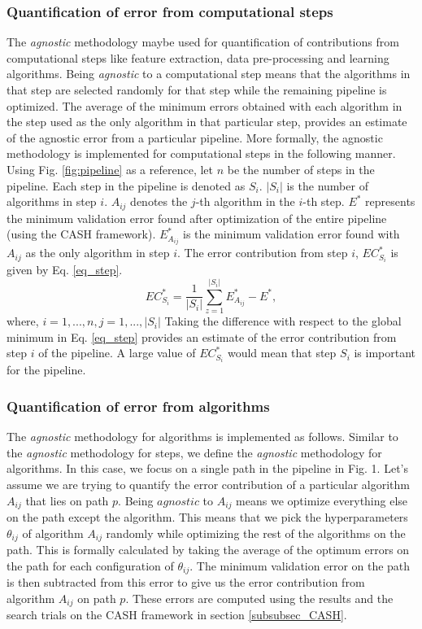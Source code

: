 \subsubsection{Quantification of error from computational steps}
\label{subsubsec_eq_steps}
The \textit{agnostic} methodology maybe used for quantification of contributions from computational steps like feature extraction, data pre-processing and learning algorithms. Being \textit{agnostic} to a computational step means that the algorithms in that step are selected randomly for that step while the remaining pipeline is optimized. The average of the minimum errors obtained with each algorithm in the step used as the only algorithm in that particular step, provides an estimate of the agnostic error from a particular pipeline.  
More formally, the agnostic methodology is implemented for computational steps in the following manner. Using Fig. \ref{fig:pipeline} as a reference, let $n$ be the number of steps in the pipeline. Each step in the pipeline is denoted as $S_i$. $|S_i|$ is the number of algorithms in step $i$. $A_{ij}$ denotes the $j$-th algorithm in the $i$-th step. $E^*$ represents the minimum validation error found after optimization of the entire pipeline (using the CASH framework). $E_{A_{ij}}^*$ is the minimum  validation error found with $A_{ij}$ as the only algorithm in step $i$. The error contribution from step $i$, $EC_{S_i}^*$ is given by Eq. \ref{eq_step}.
\begin{equation}
\label{eq_step}
EC_{S_i}^* = \frac{1}{|S_i|}\sum_{z=1}^{|S_i|} E_{A_{ij}}^* - E^*,
\end{equation}
where, $i = {1, ..., n}, j = {1, ..., |S_i|}$
Taking the difference with respect to the global minimum in Eq. \ref{eq_step} provides an estimate of the error contribution from step $i$ of the pipeline. A large value of $EC_{S_i}^*$ would mean that step $S_i$ is important for the pipeline.

\subsubsection{Quantification of error from algorithms}
\label{subsubsec_eq_alg}
The \textit{agnostic} methodology for algorithms is implemented as follows. Similar to the \textit{agnostic} methodology for steps, we define the \textit{agnostic} methodology for algorithms. In this case, we focus on a single path in the pipeline in Fig. 1. Let's assume we are trying to quantify the error contribution of a particular algorithm $A_{ij}$ that lies on path $p$. Being $agnostic$ to $A_{ij}$ means we optimize everything else on the path except the algorithm. This means that we pick the hyperparameters $\theta_{ij}$ of algorithm $A_{ij}$ randomly while optimizing the rest of the algorithms on the path. This is formally calculated by taking the average of the optimum errors on the path for each configuration of $\theta_{ij}$. The minimum validation error on the path is then subtracted from this error to give us the error contribution from algorithm $A_{ij}$ on path $p$. These errors are computed using the results and the search trials on the CASH framework in section \ref{subsubsec_CASH}.

